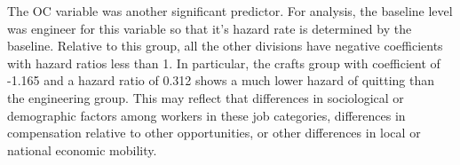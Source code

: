 \documentclass[12pt,letterpaper]{article}
\begin{document}
The OC variable was another significant predictor. For analysis, the baseline level was engineer for this variable so that it's hazard rate is determined by the baseline. Relative to this group, all the other divisions have negative coefficients with hazard ratios less than 1. In particular, the crafts group with coefficient of -1.165 and a hazard ratio of 0.312 shows a much lower hazard of quitting than the engineering group.  This may reflect that differences in sociological or demographic factors among workers in these job categories, differences in compensation relative to other opportunities, or other differences in local or national economic mobility.
\end{document}
